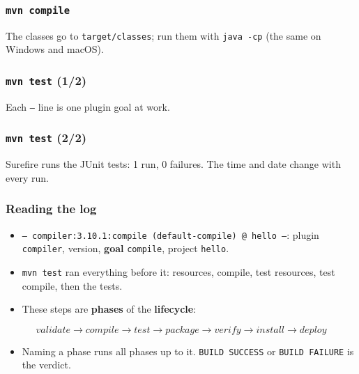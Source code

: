 \documentclass[aspectratio=169,10pt,compress]{beamer}
\begin{document}




\begin{frame}[t,fragile] \frametitle{\texttt{mvn compile}}

  \vspace{0.1em}
  \small
  The classes go to \texttt{target/classes}; run them with \texttt{java -cp} (the same on Windows and macOS).
\end{frame}




\begin{frame}[t,fragile] \frametitle{\texttt{mvn test} (1/2)}

  \vspace{0.1em}
  \small Each \texttt{---} line is one plugin goal at work.
\end{frame}




\begin{frame}[t,fragile] \frametitle{\texttt{mvn test} (2/2)}

  \vspace{0.1em}
  \small Surefire runs the JUnit tests: 1 run, 0 failures. The time and date change with every run.
\end{frame}




\begin{frame}[t,fragile] \frametitle{Reading the log}
  \begin{itemize}\small
    \item \texttt{--- compiler:3.10.1:compile (default-compile) @ hello ---}: plugin \texttt{compiler}, version, \textbf{goal} \texttt{compile}, project \texttt{hello}.
    \item \texttt{mvn test} ran everything before it: resources, compile, test resources, test compile, then the tests.
    \item These steps are \textbf{phases} of the \textbf{lifecycle}:
  \end{itemize}
  \[
  	\mathit{validate} \to \mathit{compile} \to \mathit{test} \to \mathit{package} \to \mathit{verify} \to \mathit{install} \to \mathit{deploy}
  \]
  \begin{itemize}\small
    \item Naming a phase runs all phases up to it. \texttt{BUILD SUCCESS} or \texttt{BUILD FAILURE} is the verdict.
  \end{itemize}
\end{frame}
\end{document}
